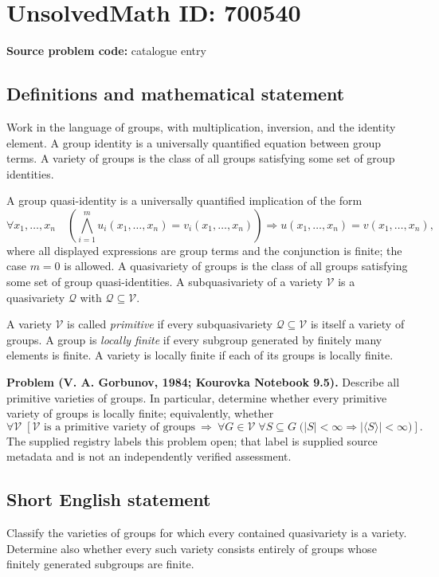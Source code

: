 \documentclass[11pt]{article}
\begin{document}
\section*{UnsolvedMath ID: 700540}
\textbf{Source problem code:} catalogue entry
\subsection{Definitions and mathematical statement}
Work in the language of groups, with multiplication, inversion, and the identity element. A group identity is a universally quantified equation between group terms. A variety of groups is the class of all groups satisfying some set of group identities.

A group quasi-identity is a universally quantified implication of the form
\[
\forall x_1,\ldots,x_n\quad
\left(\bigwedge_{i=1}^{m} u_i(x_1,\ldots,x_n)=v_i(x_1,\ldots,x_n)\right)
\Longrightarrow u(x_1,\ldots,x_n)=v(x_1,\ldots,x_n),
\]
where all displayed expressions are group terms and the conjunction is finite; the case \(m=0\) is allowed. A quasivariety of groups is the class of all groups satisfying some set of group quasi-identities. A subquasivariety of a variety \(\mathcal V\) is a quasivariety \(\mathcal Q\) with \(\mathcal Q\subseteq\mathcal V\).

A variety \(\mathcal V\) is called \emph{primitive} if every subquasivariety \(\mathcal Q\subseteq\mathcal V\) is itself a variety of groups. A group is \emph{locally finite} if every subgroup generated by finitely many elements is finite. A variety is locally finite if each of its groups is locally finite.

\textbf{Problem (V. A. Gorbunov, 1984; Kourovka Notebook 9.5).} Describe all primitive varieties of groups. In particular, determine whether every primitive variety of groups is locally finite; equivalently, whether
\[
\forall\mathcal V\;\left[\mathcal V\text{ is a primitive variety of groups}\ \Longrightarrow\ 
\forall G\in\mathcal V\;\forall S\subseteq G\;
\bigl(|S|<\infty\Longrightarrow |\langle S\rangle|<\infty\bigr)\right].
\]
The supplied registry labels this problem open; that label is supplied source metadata and is not an independently verified assessment.
\subsection{Short English statement}
Classify the varieties of groups for which every contained quasivariety is a variety. Determine also whether every such variety consists entirely of groups whose finitely generated subgroups are finite.
\end{document}
